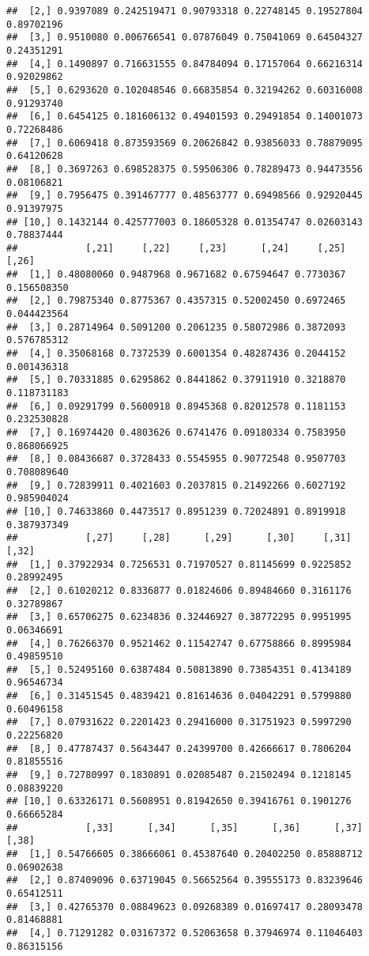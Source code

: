 \documentclass[
]{article}
\begin{document}
\begin{verbatim}
##  [2,] 0.9397089 0.242519471 0.90793318 0.22748145 0.19527804 0.89702196
##  [3,] 0.9510080 0.006766541 0.07876049 0.75041069 0.64504327 0.24351291
##  [4,] 0.1490897 0.716631555 0.84784094 0.17157064 0.66216314 0.92029862
##  [5,] 0.6293620 0.102048546 0.66835854 0.32194262 0.60316008 0.91293740
##  [6,] 0.6454125 0.181606132 0.49401593 0.29491854 0.14001073 0.72268486
##  [7,] 0.6069418 0.873593569 0.20626842 0.93856033 0.78879095 0.64120628
##  [8,] 0.3697263 0.698528375 0.59506306 0.78289473 0.94473556 0.08106821
##  [9,] 0.7956475 0.391467777 0.48563777 0.69498566 0.92920445 0.91397975
## [10,] 0.1432144 0.425777003 0.18605328 0.01354747 0.02603143 0.78837444
##            [,21]     [,22]     [,23]      [,24]     [,25]       [,26]
##  [1,] 0.48080060 0.9487968 0.9671682 0.67594647 0.7730367 0.156508350
##  [2,] 0.79875340 0.8775367 0.4357315 0.52002450 0.6972465 0.044423564
##  [3,] 0.28714964 0.5091200 0.2061235 0.58072986 0.3872093 0.576785312
##  [4,] 0.35068168 0.7372539 0.6001354 0.48287436 0.2044152 0.001436318
##  [5,] 0.70331885 0.6295862 0.8441862 0.37911910 0.3218870 0.118731183
##  [6,] 0.09291799 0.5600918 0.8945368 0.82012578 0.1181153 0.232530828
##  [7,] 0.16974420 0.4803626 0.6741476 0.09180334 0.7583950 0.868066925
##  [8,] 0.08436687 0.3728433 0.5545955 0.90772548 0.9507703 0.708089640
##  [9,] 0.72839911 0.4021603 0.2037815 0.21492266 0.6027192 0.985904024
## [10,] 0.74633860 0.4473517 0.8951239 0.72024891 0.8919918 0.387937349
##            [,27]     [,28]      [,29]      [,30]     [,31]      [,32]
##  [1,] 0.37922934 0.7256531 0.71970527 0.81145699 0.9225852 0.28992495
##  [2,] 0.61020212 0.8336877 0.01824606 0.89484660 0.3161176 0.32789867
##  [3,] 0.65706275 0.6234836 0.32446927 0.38772295 0.9951995 0.06346691
##  [4,] 0.76266370 0.9521462 0.11542747 0.67758866 0.8995984 0.49859510
##  [5,] 0.52495160 0.6387484 0.50813890 0.73854351 0.4134189 0.96546734
##  [6,] 0.31451545 0.4839421 0.81614636 0.04042291 0.5799880 0.60496158
##  [7,] 0.07931622 0.2201423 0.29416000 0.31751923 0.5997290 0.22256820
##  [8,] 0.47787437 0.5643447 0.24399700 0.42666617 0.7806204 0.81855516
##  [9,] 0.72780997 0.1830891 0.02085487 0.21502494 0.1218145 0.08839220
## [10,] 0.63326171 0.5608951 0.81942650 0.39416761 0.1901276 0.66665284
##            [,33]      [,34]      [,35]      [,36]      [,37]      [,38]
##  [1,] 0.54766605 0.38666061 0.45387640 0.20402250 0.85888712 0.06902638
##  [2,] 0.87409096 0.63719045 0.56652564 0.39555173 0.83239646 0.65412511
##  [3,] 0.42765370 0.08849623 0.09268389 0.01697417 0.28093478 0.81468881
##  [4,] 0.71291282 0.03167372 0.52063658 0.37946974 0.11046403 0.86315156

\end{verbatim}
\end{document}
